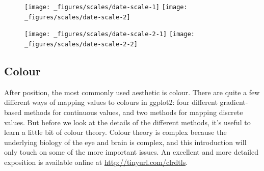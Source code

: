 \begin{figure}[H]
  \texttt{[image: \_figures/scales/date-scale-1]}%
  \texttt{[image: \_figures/scales/date-scale-2]}
\end{figure}

\begin{Shaded}
\end{Shaded}

\begin{figure}[H]
  \texttt{[image: \_figures/scales/date-scale-2-1]}%
  \texttt{[image: \_figures/scales/date-scale-2-2]}
\end{figure}

\subsection{Colour}\label{sub:scale-colour}

After position, the most commonly used aesthetic is colour. There are
quite a few different ways of mapping values to colours in ggplot2: four
different gradient-based methods for continuous values, and two methods
for mapping discrete values. But before we look at the details of the
different methods, it's useful to learn a little bit of colour theory.
Colour theory is complex because the underlying biology of the eye and
brain is complex, and this introduction will only touch on some of the
more important issues. An excellent and more detailed exposition is
available online at \url{http://tinyurl.com/clrdtls}. 

